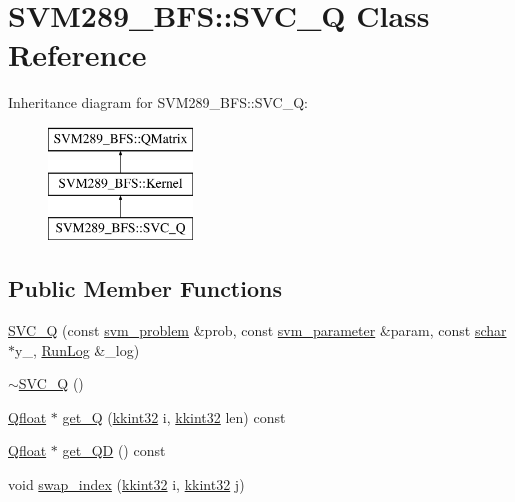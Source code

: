 \hypertarget{class_s_v_m289___b_f_s_1_1_s_v_c___q}{}\section{S\+V\+M289\+\_\+\+B\+FS\+:\+:S\+V\+C\+\_\+Q Class Reference}
\label{class_s_v_m289___b_f_s_1_1_s_v_c___q}
Inheritance diagram for S\+V\+M289\+\_\+\+B\+FS\+:\+:S\+V\+C\+\_\+Q\+:\begin{figure}[H]
\begin{center}
\leavevmode
\includegraphics[height=3.000000cm]{class_s_v_m289___b_f_s_1_1_s_v_c___q}
\end{center}
\end{figure}
\subsection*{Public Member Functions}
\begin{DoxyCompactItemize}
\item 
\hyperlink{class_s_v_m289___b_f_s_1_1_s_v_c___q_a64d17f7422936029570273e75275cd06}{S\+V\+C\+\_\+Q} (const \hyperlink{struct_s_v_m289___b_f_s_1_1svm__problem}{svm\+\_\+problem} \&prob, const \hyperlink{struct_s_v_m289___b_f_s_1_1svm__parameter}{svm\+\_\+parameter} \&param, const \hyperlink{namespace_s_v_m289___b_f_s_a67b51ac46a91cdb7ad72dea9fad6c0f0}{schar} $\ast$y\+\_\+, \hyperlink{class_k_k_b_1_1_run_log}{Run\+Log} \&\+\_\+log)
\item 
\hyperlink{class_s_v_m289___b_f_s_1_1_s_v_c___q_a2ed22522eba1d89f6dbc04266590f984}{$\sim$\+S\+V\+C\+\_\+Q} ()
\item 
\hyperlink{namespace_s_v_m289___b_f_s_a8b0a7657dcefcb6e9a857c9b5e2fd2ef}{Qfloat} $\ast$ \hyperlink{class_s_v_m289___b_f_s_1_1_s_v_c___q_a07039d2ce81484ea2d2f0743ea66e506}{get\+\_\+Q} (\hyperlink{namespace_k_k_b_a8fa4952cc84fda1de4bec1fbdd8d5b1b}{kkint32} i, \hyperlink{namespace_k_k_b_a8fa4952cc84fda1de4bec1fbdd8d5b1b}{kkint32} len) const 
\item 
\hyperlink{namespace_s_v_m289___b_f_s_a8b0a7657dcefcb6e9a857c9b5e2fd2ef}{Qfloat} $\ast$ \hyperlink{class_s_v_m289___b_f_s_1_1_s_v_c___q_a5321cdf78a35cb30dda241d3aa61c1af}{get\+\_\+\+QD} () const 
\item 
void \hyperlink{class_s_v_m289___b_f_s_1_1_s_v_c___q_a4ff1abb91d8345093e6e66c01a09bb33}{swap\+\_\+index} (\hyperlink{namespace_k_k_b_a8fa4952cc84fda1de4bec1fbdd8d5b1b}{kkint32} i, \hyperlink{namespace_k_k_b_a8fa4952cc84fda1de4bec1fbdd8d5b1b}{kkint32} j)
\end{DoxyCompactItemize}
